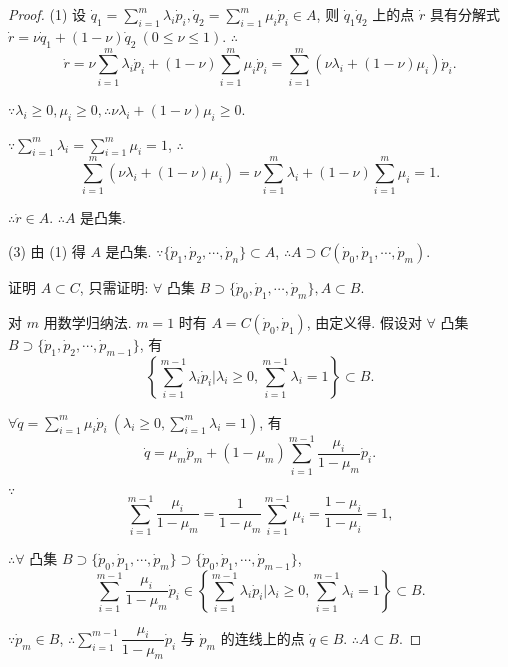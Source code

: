 \documentclass{ctexart}
\begin{document}
\begin{proof}
    (1) 设 $\dot{q}_1=\sum\limits_{i=1}^m\lambda_i\dot{p}_i,\dot{q}_2=\sum\limits_{i=1}^m\mu_i\dot{p}_i\in A$, 则 $\dot{q}_1\dot{q}_2$ 上的点 $\dot{r}$ 具有分解式 $\dot{r}=\nu\dot{q}_1+(1-\nu)\dot{q}_2\ (0\leq\nu\leq1)$. $\therefore$
    \[\dot{r}=\nu\sum\limits_{i=1}^m\lambda_i\dot{p}_i+(1-\nu)\sum\limits_{i=1}^m\mu_i\dot{p}_i=\sum\limits_{i=1}^m(\nu\lambda_i+(1-\nu)\mu_i)\dot{p}_i.\]

    $\because\lambda_i\geq0,\mu_i\geq0,\therefore\nu\lambda_i+(1-\nu)\mu_i\geq0$.

    $\because\sum\limits_{i=1}^m\lambda_i=\sum\limits_{i=1}^m\mu_i=1$, $\therefore$
    \[\sum\limits_{i=1}^m(\nu\lambda_i+(1-\nu)\mu_i)=\nu\sum\limits_{i=1}^m\lambda_i+(1-\nu)\sum\limits_{i=1}^m\mu_i=1.\]

    $\therefore\dot{r}\in A$. $\therefore A$ 是凸集.

    (3) 由 (1) 得 $A$ 是凸集. $\because\{\dot{p}_1,\dot{p}_2,\cdots,\dot{p}_n\}\subset A$, $\therefore A\supset C(\dot{p}_0,\dot{p}_1,\cdots,\dot{p}_m)$.

    证明 $A\subset C$, 只需证明: $\forall$ 凸集 $B\supset\{\dot{p}_0,\dot{p}_1,\cdots,\dot{p}_m\},A\subset B$.

    对 $m$ 用数学归纳法. $m=1$ 时有 $A=C(\dot{p}_0,\dot{p}_1)$, 由定义得. 假设对 $\forall$ 凸集 $B\supset\{\dot{p}_1,\dot{p}_2,\cdots,\dot{p}_{m-1}\}$, 有
    \[\left\{\sum\limits_{i=1}^{m-1}\lambda_i\dot{p}_i\Bigg|\lambda_i\geq0,\sum\limits_{i=1}^{m-1}\lambda_i=1\right\}\subset B.\]

    $\forall\dot{q}=\sum\limits_{i=1}^m\mu_i\dot{p}_i\ \left(\lambda_i\geq0,\sum\limits_{i=1}^m\lambda_i=1\right)$, 有
    \[\dot{q}=\mu_m\dot{p}_m+(1-\mu_m)\sum\limits_{i=1}^{m-1}\dfrac{\mu_i}{1-\mu_m}\dot{p}_i.\]

    $\because$
    \[\sum\limits_{i=1}^{m-1}\dfrac{\mu_i}{1-\mu_m}=\dfrac{1}{1-\mu_m}\sum\limits_{i=1}^{m-1}\mu_i=\dfrac{1-\mu_i}{1-\mu_i}=1,\]

    $\therefore\forall$ 凸集 $B\supset\{\dot{p}_0,\dot{p}_1,\cdots,\dot{p}_m\}\supset\{\dot{p}_0,\dot{p}_1,\cdots,\dot{p}_{m-1}\}$,
    \[\sum\limits_{i=1}^{m-1}\dfrac{\mu_i}{1-\mu_m}\dot{p}_i\in\left\{\sum\limits_{i=1}^{m-1}\lambda_i\dot{p}_i\Bigg|\lambda_i\geq0,\sum\limits_{i=1}^{m-1}\lambda_i=1\right\}\subset B.\]

    $\because\dot{p}_m\in B$, $\therefore\sum\limits_{i=1}^{m-1}\dfrac{\mu_i}{1-\mu_m}\dot{p}_i$ 与 $\dot{p}_m$ 的连线上的点 $\dot{q}\in B$. $\therefore A\subset B$.
\end{proof}
\end{document}
